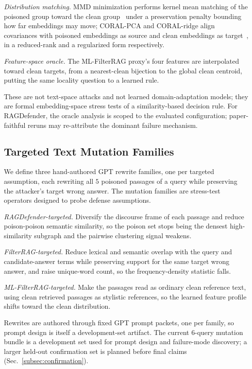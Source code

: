 \documentclass[conference]{IEEEtran}
\newcommand{\NdevQ}{6}           %
\newcommand{\Npoison}{5}         %
\begin{document}
\textit{Distribution matching.} MMD minimization performs kernel mean matching of
the poisoned group toward the clean group~\cite{gretton2012mmd} under a
preservation penalty bounding how far embeddings may move; CORAL-PCA and
CORAL-ridge align covariances with poisoned embeddings as source and clean
embeddings as target~\cite{sun2016coral}, in a reduced-rank and a regularized
form respectively.

\textit{Feature-space oracle.} The ML-FilterRAG proxy's four features are
interpolated toward clean targets, from a nearest-clean bijection to the global
clean centroid, putting the same locality question to a learned rule.

These are not text-space attacks and not learned domain-adaptation models; they
are formal embedding-space stress tests of a similarity-based decision rule.
For RAGDefender, the oracle analysis is scoped to the evaluated configuration;
paper-faithful reruns may re-attribute the dominant failure mechanism.

\subsection{Targeted Text Mutation Families}
\label{subsec:families_mut}
We define three hand-authored GPT rewrite families, one per targeted assumption,
each rewriting all $\Npoison$ poisoned passages of a query while preserving the
attacker's target wrong answer. The mutation families are stress-test operators
designed to probe defense assumptions.

\textit{RAGDefender-targeted.} Diversify the discourse frame of each passage and
reduce poison-poison semantic similarity, so the poison set stops being the
densest high-similarity subgraph and the pairwise clustering signal weakens.

\textit{FilterRAG-targeted.} Reduce lexical and semantic overlap with the query
and candidate-answer terms while preserving support for the same target wrong
answer, and raise unique-word count, so the frequency-density statistic falls.

\textit{ML-FilterRAG-targeted.} Make the passages read as ordinary clean
reference text, using clean retrieved passages as stylistic references, so the
learned feature profile shifts toward the clean distribution.

Rewrites are authored through fixed GPT prompt packets, one per family, so prompt
design is itself a development-set artifact. The current $\NdevQ$-query mutation
bundle is a development set used for prompt design and failure-mode discovery; a
larger held-out confirmation set is planned before final claims
(Sec.~\ref{subsec:confirmation}).
\end{document}
